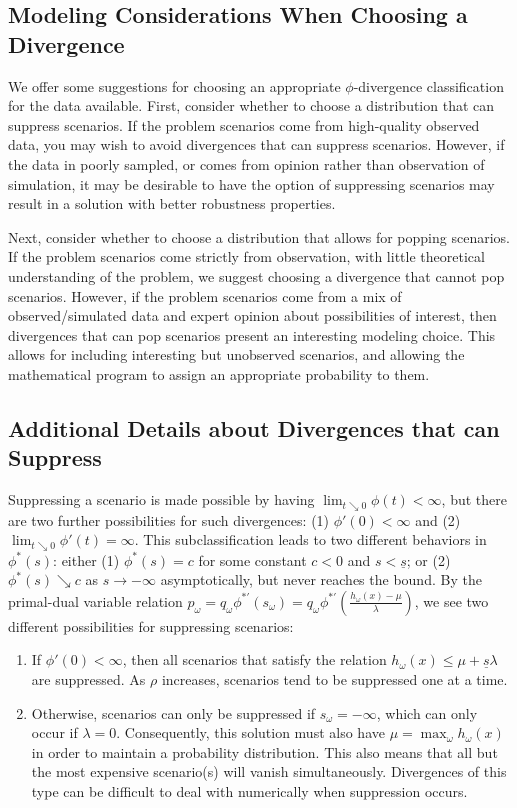 \documentclass[11pt]{article}
\begin{document}
\subsection{Modeling Considerations When Choosing a Divergence}

We offer some suggestions for choosing an appropriate $\phi$-divergence classification for the data available.
First, consider whether to choose a distribution that can suppress scenarios.
If the problem scenarios come from high-quality observed data, you may wish to avoid divergences that can suppress scenarios.
However, if the data in poorly sampled, or comes from opinion rather than observation of simulation, it may be desirable to have the option of suppressing scenarios may result in a solution with better robustness properties.

Next, consider whether to choose a distribution that allows for popping scenarios.
If the problem scenarios come strictly from observation, with little theoretical understanding of the problem, we suggest choosing a divergence that cannot pop scenarios.
However, if the problem scenarios come from a mix of observed/simulated data and expert opinion about possibilities of interest, then divergences that can pop scenarios present an interesting modeling choice.
This allows for including interesting but unobserved scenarios, and allowing the mathematical program to assign an appropriate probability to them.

\subsection{Additional Details about Divergences that can Suppress}

Suppressing a scenario is made possible by having $\lim_{t \searrow 0} \phi(t) < \infty$, but there are two further possibilities for such divergences: (1) $\phi'(0) < \infty$ and (2) $\lim_{t \searrow 0} \phi'(t) = \infty$.
This subclassification leads to two different behaviors in $\phi^*(s)$: either (1) $\phi^*(s) = c$ for some constant $c < 0$ and  $s < \underline{s}$; or (2) $\phi^*(s) \searrow c$ as $s \rightarrow -\infty$ asymptotically, but never reaches the bound.
By the primal-dual variable relation $p_\omega = q_\omega \phi^{*\prime}(s_\omega) = q_\omega \phi^{*\prime}\left(\frac{h_\omega(x) - \mu}{\lambda}\right)$, we see two different possibilities for suppressing scenarios:
\begin{enumerate}
	\item If $\phi'(0) < \infty$, then all scenarios that satisfy the relation $h_\omega(x) \leq \mu + \underline{s}\lambda$ are suppressed.
		As $\rho$ increases, scenarios tend to be suppressed one at a time.
	\item Otherwise, scenarios can only be suppressed if $s_\omega = -\infty$, which can only occur if $\lambda = 0$.
		Consequently, this solution must also have $\mu = \max_\omega h_\omega(x)$ in order to maintain a probability distribution.
		This also means that all but the most expensive scenario(s) will vanish simultaneously.
		Divergences of this type can be difficult to deal with numerically when suppression occurs.
\end{enumerate}
\end{document}
